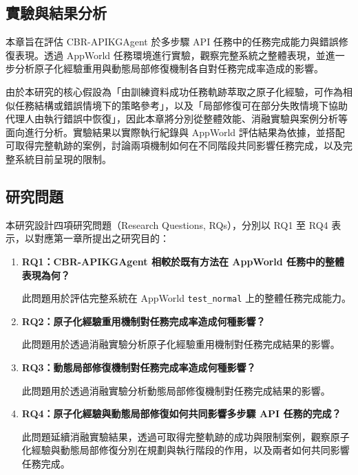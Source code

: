 \begin{ZhChapter}

\chapter{實驗與結果分析}

本章旨在評估 CBR-APIKGAgent 於多步驟 API 任務中的任務完成能力與錯誤修復表現。透過 AppWorld 任務環境進行實驗，觀察完整系統之整體表現，並進一步分析原子化經驗重用與動態局部修復機制各自對任務完成率造成的影響。

由於本研究的核心假設為「由訓練資料成功任務軌跡萃取之原子化經驗，可作為相似任務結構或錯誤情境下的策略參考」，以及「局部修復可在部分失敗情境下協助代理人由執行錯誤中恢復」，因此本章將分別從整體效能、消融實驗與案例分析等面向進行分析。實驗結果以實際執行紀錄與 AppWorld 評估結果為依據，並搭配可取得完整軌跡的案例，討論兩項機制如何在不同階段共同影響任務完成，以及完整系統目前呈現的限制。

\section{研究問題}

本研究設計四項研究問題（Research Questions, RQs），分別以 RQ1 至 RQ4 表示，以對應第一章所提出之研究目的：

\begin{enumerate}
    \item \textbf{RQ1：CBR-APIKGAgent 相較於既有方法在 AppWorld 任務中的整體表現為何？}

    此問題用於評估完整系統在 AppWorld \texttt{test\_normal} 上的整體任務完成能力。

    \item \textbf{RQ2：原子化經驗重用機制對任務完成率造成何種影響？}

    此問題用於透過消融實驗分析原子化經驗重用機制對任務完成結果的影響。

    \item \textbf{RQ3：動態局部修復機制對任務完成率造成何種影響？}

    此問題用於透過消融實驗分析動態局部修復機制對任務完成結果的影響。

    \item \textbf{RQ4：原子化經驗與動態局部修復如何共同影響多步驟 API 任務的完成？}

    此問題延續消融實驗結果，透過可取得完整軌跡的成功與限制案例，觀察原子化經驗與動態局部修復分別在規劃與執行階段的作用，以及兩者如何共同影響任務完成。
\end{enumerate}


\end{ZhChapter}
